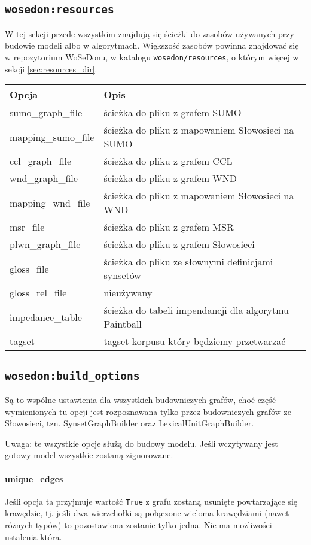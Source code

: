 \documentclass[10pt,a4paper]{article}
\begin{document}
\subsection{\texttt{wosedon:resources}}
W tej sekcji przede wszystkim znajdują się ścieżki do zasobów używanych przy budowie modeli albo w algorytmach. Większość zasobów powinna znajdować się w repozytorium WoSeDonu, w katalogu \texttt{wosedon/resources}, o którym więcej w sekcji \ref{sec:resources_dir}.

\begin{longtable}{l l}
\toprule
Opcja & Opis \\
\midrule
sumo\_graph\_file & ścieżka do pliku z grafem SUMO \\ \addlinespace
mapping\_sumo\_file & ścieżka do pliku z mapowaniem Słowosieci na SUMO \\ \addlinespace
ccl\_graph\_file & ścieżka do pliku z grafem CCL \\
wnd\_graph\_file & ścieżka do pliku z grafem WND \\ \addlinespace
mapping\_wnd\_file & ścieżka do pliku z mapowaniem Słowosieci na WND \\ \addlinespace
msr\_file & ścieżka do pliku z grafem MSR \\
plwn\_graph\_file & ścieżka do pliku z grafem Słowosieci \\ \addlinespace
gloss\_file & ścieżka do pliku ze słownymi definicjami synsetów \\ \addlinespace
gloss\_rel\_file & nieużywany \\ \addlinespace
impedance\_table & ścieżka do tabeli impendancji dla algorytmu Paintball \\ \addlinespace
tagset & tagset korpusu który będziemy przetwarzać \\
\bottomrule
\end{longtable}


\subsection{\texttt{wosedon:build\_options}}
Są to wspólne ustawienia dla wszystkich budowniczych grafów, choć część wymienionych tu opcji jest rozpoznawana tylko przez budowniczych grafów ze Słowosieci, tzn. SynsetGraphBuilder oraz LexicalUnitGraphBuilder.

Uwaga: te wszystkie opcje służą do budowy modelu. Jeśli wczytywany jest gotowy model wszystkie zostaną zignorowane.

\paragraph{unique\_edges}
Jeśli opcja ta przyjmuje wartość \texttt{True} z grafu zostaną usunięte powtarzające się krawędzie, tj. jeśli dwa wierzchołki są połączone wieloma krawędziami (nawet różnych typów) to pozostawiona zostanie tylko jedna. Nie ma możliwości ustalenia która.
\end{document}
